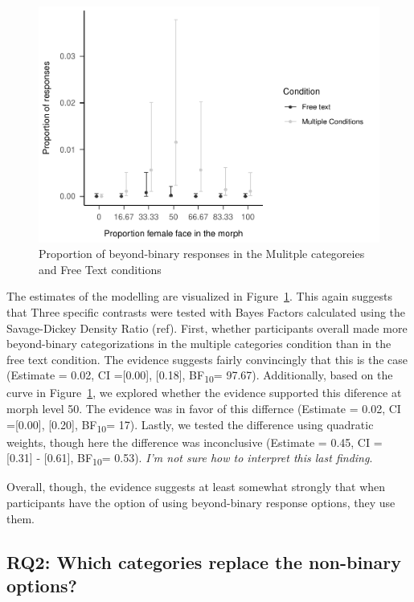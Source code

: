 \documentclass[
  man]{apa7}
\begin{document}
\begin{figure}
\centering
\includegraphics{papaja-test_files/figure-latex/exp-one-inf-1.pdf}
\caption{\label{fig:exp-one-inf}Proportion of beyond-binary responses in the Mulitple categoreies and Free Text conditions}
\end{figure}

The estimates of the modelling are visualized in Figure~\ref{fig:exp-one-inf}. This again suggests that Three specific contrasts were tested with Bayes Factors calculated using the Savage-Dickey Density Ratio (ref). First, whether participants overall made more beyond-binary categorizations in the multiple categories condition than in the free text condition. The evidence suggests fairly convincingly that this is the case (Estimate = 0.02, CI ={[}0.00{]}, {[}0.18{]}, BF\textsubscript{10}= 97.67). Additionally, based on the curve in Figure~\ref{fig:exp-one-inf}, we explored whether the evidence supported this diference at morph level 50. The evidence was in favor of this differnce (Estimate = 0.02, CI ={[}0.00{]}, {[}0.20{]}, BF\textsubscript{10}= 17). Lastly, we tested the difference using quadratic weights, though here the difference was inconclusive (Estimate = 0.45, CI = {[}0.31{]} - {[}0.61{]}, BF\textsubscript{10}= 0.53). \emph{I'm not sure how to interpret this last finding}.

Overall, though, the evidence suggests at least somewhat strongly that when participants have the option of using beyond-binary response options, they use them.

\hypertarget{rq2-which-categories-replace-the-non-binary-options}{%
\subsection{RQ2: Which categories replace the non-binary options?}\label{rq2-which-categories-replace-the-non-binary-options}}
\end{document}
